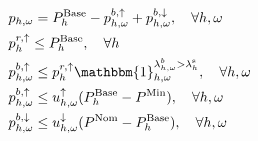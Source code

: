 {\begin{subequations}
\begin{align}
        \quad                                                                                             & \quad p_{h,\omega} = P^{\text{Base}}_{h} - p^{b, \uparrow}_{h,\omega} + p^{b, \downarrow}_{h,\omega}, \quad                                                                                                  \forall{h,\omega}                                                                             \label{power:6}                                                        \\
        \quad                                                                                             & \quad p^{r, \uparrow}_h \leq P^{\text{Base}}_h,
        \quad                                                                                                                                                        \forall{h}                                                                                     \label{power:7}                                                                                                                                                                                                           \\
        \quad                                                                                             & \quad p^{b, \uparrow}_{h,\omega} \leq p^{r, \uparrow}_h \mathbbm{1}_{h,\omega}^{\lambda^{b}_{h,\omega} > \lambda^{\rm{s}}_{h}} , \quad                                                                            \forall{h,\omega}                                                                             \label{power:8}                                                   \\
        \quad                                                                                             & \quad p^{b, \uparrow}_{h,\omega} \leq u_{h,\omega}^{\uparrow} (P^{\text{Base}}_{h} - P^{\text{Min}}) , \quad                                                                                                       \forall{h,\omega}                                                                             \label{power:9}                                                  \\
        \quad                                                                                             & \quad p^{b, \downarrow}_{h,\omega} \leq u^{\downarrow}_{h,\omega} (P^{\text{Nom}} -P^{\text{Base}}_{h}), \quad                                                                                              \forall{h,\omega}                                                                             \label{power:10}                                                        \\

\end{align}
\end{subequations}}
